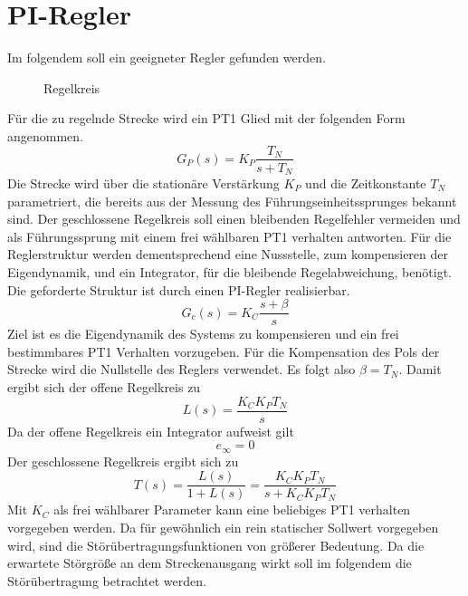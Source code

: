 \section{PI-Regler}
Im folgendem soll ein geeigneter Regler gefunden werden.
\begin{figure}[H]
\caption{Regelkreis}
\label{Grundlagen:Regelkreis}
\end{figure}
Für die zu regelnde Strecke wird ein PT1 Glied mit der folgenden Form angenommen.
\begin{equation}
	G_P(s) = K_P\frac{T_N}{s+T_N}
\end{equation}
Die Strecke wird über die stationäre Verstärkung $K_P$ und die Zeitkonstante $T_N$ parametriert, die bereits aus der Messung des Führungseinheitssprunges bekannt sind. Der geschlossene Regelkreis soll einen bleibenden Regelfehler vermeiden und als Führungssprung mit einem frei wählbaren PT1 verhalten antworten. Für die Reglerstruktur werden dementsprechend eine Nussstelle, zum kompensieren der Eigendynamik, und ein Integrator, für die bleibende Regelabweichung, benötigt. Die geforderte Struktur ist durch einen PI-Regler realisierbar.
\begin{equation}
	G_c(s) = K_C \frac{s + \beta}{s}
\end{equation}
Ziel ist es die Eigendynamik des Systems zu kompensieren und ein frei bestimmbares PT1 Verhalten vorzugeben. Für die Kompensation des Pols der Strecke wird die Nullstelle des Reglers verwendet. Es folgt also $\beta = T_N$. Damit ergibt sich der offene Regelkreis zu
\begin{equation}
	L(s) = \frac{K_C K_P T_N}{s}
\end{equation}
Da der offene Regelkreis ein Integrator aufweist gilt
\begin{equation}
	e_\infty = 0
\end{equation}
Der geschlossene Regelkreis ergibt sich zu 
\begin{equation}
	T(s) = \frac{L(s)}{1+L(s)} = \frac{K_C K_P T_N}{s + K_C K_P T_N}
\end{equation}
Mit $K_C$ als frei wählbarer Parameter kann eine beliebiges PT1 verhalten vorgegeben werden. Da für gewöhnlich ein rein statischer Sollwert vorgegeben wird, sind die Störübertragungsfunktionen von größerer Bedeutung. Da die erwartete Störgröße an dem Streckenausgang wirkt soll im folgendem die Störübertragung betrachtet werden.

